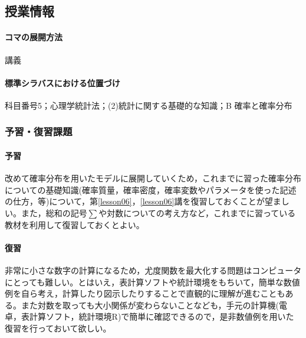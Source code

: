 \subsection{授業情報}
\paragraph{コマの展開方法}
講義
\paragraph{標準シラバスにおける位置づけ}
科目番号5；心理学統計法；(2)統計に関する基礎的な知識；B 確率と確率分布
\subsubsection{予習・復習課題}
\paragraph{予習}
改めて確率分布を用いたモデルに展開していくため，これまでに習った確率分布についての基礎知識(確率質量，確率密度，確率変数やパラメータを使った記述の仕方，等)について，第\ref{lesson06}，\ref{lesson06}講を復習しておくことが望ましい。また，総和の記号$\sum$や対数についての考え方など，これまでに習っている教材を利用して復習しておくとよい。
\paragraph{復習}
非常に小さな数字の計算になるため，尤度関数を最大化する問題はコンピュータにとっても難しい。とはいえ，表計算ソフトや統計環境をもちいて，簡単な数値例を自ら考え，計算したり図示したりすることで直観的に理解が進むこともある。また対数を取っても大小関係が変わらないことなども，手元の計算機(電卓，表計算ソフト，統計環境R)で簡単に確認できるので，是非数値例を用いた復習を行っておいて欲しい。